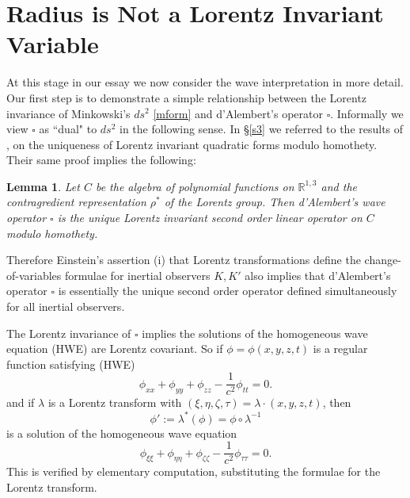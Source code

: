 \documentclass[12pt]{article}
\newtheorem*{lem}{Lemma}
\newcommand{\bR}{\mathbb{R}}
\begin{document}
\section{Radius is Not a Lorentz Invariant Variable}\label{wes}

At this stage in our essay we now consider the wave interpretation in more detail. Our first step is to demonstrate a simple relationship between the Lorentz invariance of Minkowski's $ds^2$ \eqref{mform} and d'Alembert's operator $\square$. Informally we view $\square$ as ``dual" to $ds^2$ in the following sense. In \S\ref{s3} we referred to the results of \cite{elton2010indefinite}, \cite{arminjon2018lorentz} on the uniqueness of Lorentz invariant quadratic forms modulo homothety. Their same proof implies the following:

\begin{lem}
Let $C$ be the algebra of polynomial functions on $\bR^{1,3}$ and the contragredient representation $\rho^*$ of the Lorentz group. Then d'Alembert's wave operator $\square$ is the unique Lorentz invariant second order linear operator on $C$ modulo homothety.
\end{lem}

Therefore Einstein's assertion (i) that Lorentz transformations define the change-of-variables formulae for inertial observers $K, K'$ also implies that d'Alembert's operator $\square$ is essentially the unique second order operator defined simultaneously for all inertial observers. 

The Lorentz invariance of $\square$ implies the solutions of the homogeneous wave equation (HWE) are Lorentz covariant. So if $\phi=\phi(x,y,z,t)$ is a regular function satisfying (HWE)
\begin{equation} \label{hw}
\phi_{xx}+\phi_{yy}+\phi_{zz}-\frac{1}{c^2}\phi_{tt}=0.
\end{equation} and if $\lambda$ is a Lorentz transform with $(\xi, \eta, \zeta, \tau)=\lambda \cdot (x,y,z,t)$, then $$\phi':=\lambda^*(\phi)=\phi\circ\lambda^{-1}$$ is a solution of the homogeneous wave equation $$\phi_{\xi \xi}+\phi_{\eta \eta}+\phi_{\zeta \zeta}-\frac{1}{c^2}\phi_{\tau \tau}=0.$$ This is verified by elementary computation, substituting the formulae for the Lorentz transform. 
\end{document}

